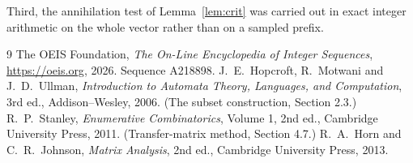 \documentclass[11pt,a4paper]{article}
\theoremstyle{plain}
\theoremstyle{definition}
\begin{document}
Third, the annihilation test of Lemma~\ref{lem:crit} was carried out in exact integer
arithmetic on the whole vector rather than on a sampled prefix.

\begin{thebibliography}{9}
 The OEIS Foundation, \emph{The On-Line Encyclopedia of Integer
Sequences}, \url{https://oeis.org}, 2026. Sequence A218898.
 J.~E.~Hopcroft, R.~Motwani and J.~D.~Ullman, \emph{Introduction to Automata
Theory, Languages, and Computation}, 3rd ed., Addison--Wesley, 2006. (The subset
construction, Section 2.3.)
 R.~P.~Stanley, \emph{Enumerative Combinatorics}, Volume 1, 2nd ed.,
Cambridge University Press, 2011. (Transfer-matrix method, Section 4.7.)
 R.~A.~Horn and C.~R.~Johnson, \emph{Matrix Analysis}, 2nd ed., Cambridge
University Press, 2013.
\end{thebibliography}
\end{document}
